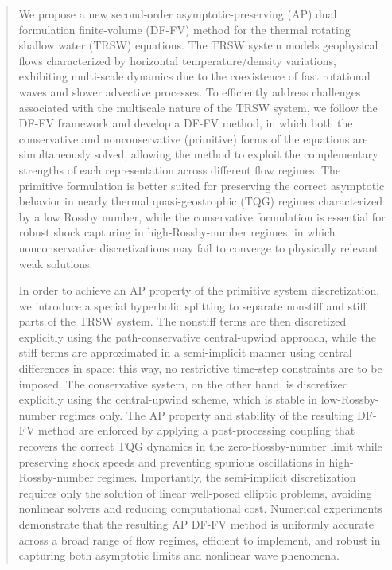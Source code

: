 \documentclass[a4paper,11pt,twoside]{article}
\numberwithin{equation}{section}
\numberwithin{figure}{section}
\numberwithin{table}{section}
\begin{document}
\begin{abstract}
We propose a new second-order asymptotic-preserving (AP) dual formulation finite-volume (DF-FV) method for the thermal rotating shallow
water (TRSW) equations. The TRSW system models geophysical flows characterized by horizontal temperature/density variations, exhibiting
multi-scale dynamics due to the coexistence of fast rotational waves and slower advective processes. To efficiently address challenges
associated with the multiscale nature of the TRSW system, we follow the DF-FV framework and develop a DF-FV method, in which both the
conservative and nonconservative (primitive) forms of the equations are simultaneously solved, allowing the method to exploit the
complementary strengths of each representation across different flow regimes. The primitive formulation is better suited for preserving the
correct asymptotic behavior in nearly thermal quasi-geostrophic (TQG) regimes characterized by a low Rossby number, while the conservative
formulation is essential for robust shock capturing in high-Rossby-number regimes, in which nonconservative discretizations may fail to
converge to physically relevant weak solutions.

In order to achieve an AP property of the primitive system discretization, we introduce a special hyperbolic splitting to separate nonstiff
and stiff parts of the TRSW system. The nonstiff terms are then discretized explicitly using the path-conservative central-upwind approach,
while the stiff terms are approximated in a semi-implicit manner using central differences in space: this way, no restrictive time-step
constraints are to be imposed. The conservative system, on the other hand, is discretized explicitly using the central-upwind scheme, which
is stable in low-Rossby-number regimes only. The AP property and stability of the resulting DF-FV method are enforced by applying a
post-processing coupling that recovers the correct TQG dynamics in the zero-Rossby-number limit while preserving shock speeds and preventing
spurious oscillations in high-Rossby-number regimes. Importantly, the semi-implicit discretization requires only the solution of linear
well-posed elliptic problems, avoiding nonlinear solvers and reducing computational cost. Numerical experiments demonstrate that the
resulting AP DF-FV method is uniformly accurate across a broad range of flow regimes, efficient to implement, and robust in capturing both
asymptotic limits and nonlinear wave phenomena.
\end{abstract}
\end{document}
